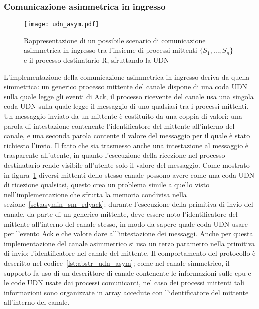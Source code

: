 \subsubsection{Comunicazione asimmetrica in ingresso}
\label{sct:asym_udn}
\begin{figure}[!t]
  \centering
  \texttt{[image: udn\_asym.pdf]}
  \caption[Comunicazione asimmetrica su UDN]{Rappresentazione di un possibile scenario di comunicazione asimmetrica in ingresso tra l'insieme di processi mittenti $\{ S_1, \dots, S_n \}$ e il processo destinatario R, sfruttando la UDN}
  \label{fig:udn_asym}
\end{figure}
L'implementazione della comunicazione asimmetrica in ingresso deriva da quella simmetrica: un generico processo mittente del canale dispone di una coda UDN sulla quale legge gli eventi di Ack, il processo ricevente del canale usa una singola coda UDN sulla quale legge il messaggio di uno qualsiasi tra i processi mittenti. Un messaggio inviato da un mittente \`e costituito da una coppia di valori: una parola di intestazione contenente l'identificatore del mittente all'interno del canale, e una seconda parola contente il valore del messaggio per il quale \`e stato richiesto l'invio. Il fatto che sia trasmesso anche una intestazione al messaggio \`e trasparente all'utente, in quanto l'esecuzione della ricezione nel processo destinatario rende visibile all'utente solo il valore del messaggio. Come mostrato in figura~\ref{fig:udn_asym} diversi mittenti dello stesso canale possono avere come una coda UDN di ricezione qualsiasi, questo crea un problema simile a quello visto nell'implementazione che sfrutta la memoria condivisa nella sezione~\ref{sct:asymin_sm_rdyack}: durante l'esecuzione della primitiva di invio del canale, da parte di un generico mittente, deve essere noto l'identificatore del mittente all'interno del canale stesso, in modo da sapere quale coda UDN usare per l'evento Ack e che valore dare all'intestazione dei messaggi. Anche per questa implementazione del canale asimmetrico si usa un terzo parametro nella primitiva di invio: l'identificatore nel canale del mittente. Il comportamento del protocollo \`e descritto nel codice~\ref{lst:abstr_udn_asym}; come nel canale simmetrico, il supporto fa uso di un descrittore di canale contenente le informazioni sulle cpu e le code UDN usate dai processi comunicanti, nel caso dei processi mittenti tali informazioni sono organizzate in array accedute con l'identificatore del mittente all'interno del canale.
